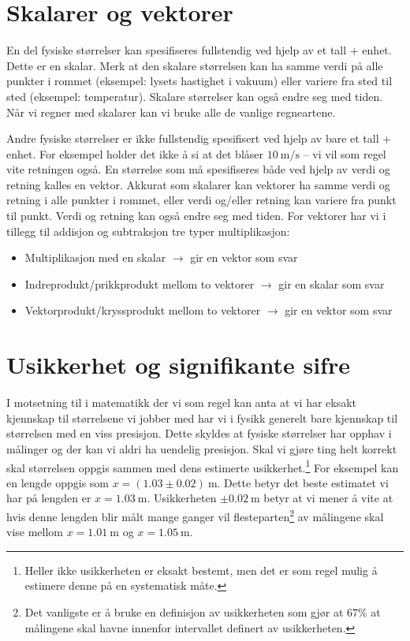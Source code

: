 \documentclass[a4paper,norsk,12pt]{article}
\begin{document}
\section{Skalarer og vektorer}
En del fysiske størrelser kan spesifiseres fullstendig ved hjelp av et tall + enhet. Dette er en skalar. Merk at den skalare størrelsen kan ha samme verdi på alle punkter i rommet (eksempel: lysets hastighet i vakuum) eller variere fra sted til sted (eksempel: temperatur). Skalare størrelser kan også endre seg med tiden. Når vi regner med skalarer kan vi bruke alle de vanlige regneartene.

Andre fysiske størrelser er ikke fullstendig spesifisert ved hjelp av bare et tall + enhet. For eksempel holder det ikke å si at det blåser $10~\mathrm{m/s}$ -- vi vil som regel vite retningen også. En størrelse som må spesifiseres både ved hjelp av verdi og retning kalles en vektor. Akkurat som skalarer kan vektorer ha samme verdi og retning i alle punkter i rommet, eller verdi og/eller retning kan variere fra punkt til punkt. Verdi og retning kan også endre seg med tiden. For vektorer har vi i tillegg til addisjon og subtraksjon tre typer multiplikasjon:
\begin{itemize}
\item Multiplikasjon med en skalar $\to$ gir en vektor som svar
\item Indreprodukt/prikkprodukt mellom to vektorer $\to$ gir en skalar som svar
\item Vektorprodukt/kryssprodukt mellom to vektorer $\to$ gir en vektor som svar
\end{itemize}

\section{Usikkerhet og signifikante sifre}
I motsetning til i matematikk der vi som regel kan anta at vi har eksakt kjennskap til størrelsene vi jobber med har vi i fysikk generelt bare kjennskap til størrelsen med en viss presisjon. Dette skyldes at fysiske størrelser har opphav i målinger og der kan vi aldri ha uendelig presisjon. Skal vi gjøre ting helt korrekt skal størrelsen oppgis sammen med dens estimerte usikkerhet.\footnote{Heller ikke usikkerheten er eksakt bestemt, men det er som regel mulig å estimere denne på en systematisk måte.
} For eksempel kan en lengde oppgis som $x=(1.03\pm0.02)~\mathrm{m}$. Dette betyr det beste estimatet vi har på lengden er $x = 1.03~\mathrm{m}$. Usikkerheten $\pm0.02~\mathrm{m}$ betyr at vi mener å vite at hvis denne lengden blir målt mange ganger vil flesteparten\footnote{Det vanligste er å bruke en definisjon av usikkerheten som gjør at 67\% at målingene skal havne innenfor intervallet definert av usikkerheten.} av målingene skal vise mellom $x=1.01~\mathrm{m}$ og $x=1.05~\mathrm{m}$. 
\end{document}
